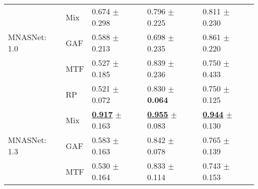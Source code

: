\begin{tabular}{lllll}
 & Mix & \textcolor[rgb]{0.5570023148,0.4429976852,0}{0.674} $\pm$ \textcolor[rgb]{1.0000000000,0.0000000000,0}{0.298} & \textcolor[rgb]{0.5976355483,0.4023644517,0}{0.796} $\pm$ \textcolor[rgb]{0.9362788663,0.0637211337,0}{0.225} & \textcolor[rgb]{0.3411102172,0.5000000000,0}{0.811} $\pm$ \textcolor[rgb]{0.3729254000,0.5000000000,0}{0.230} \\
MNASNet: 1.0 & GAF & \textcolor[rgb]{0.7543402778,0.2456597222,0}{0.588} $\pm$ \textcolor[rgb]{0.7152474728,0.2847525272,0}{0.213} & \textcolor[rgb]{0.9676133533,0.0323866467,0}{0.698} $\pm$ \textcolor[rgb]{0.9920961509,0.0079038491,0}{0.235} & \textcolor[rgb]{0.2123893805,0.5000000000,0}{0.861} $\pm$ \textcolor[rgb]{0.3434889631,0.5000000000,0}{0.220} \\
 & MTF & \textcolor[rgb]{0.8923611111,0.1076388889,0}{0.527} $\pm$ \textcolor[rgb]{0.6198605364,0.3801394636,0}{0.185} & \textcolor[rgb]{0.4349775785,0.5000000000,0}{0.839} $\pm$ \textcolor[rgb]{1.0000000000,0.0000000000,0}{0.236} & \textcolor[rgb]{0.4955752212,0.5000000000,0}{0.750} $\pm$ \textcolor[rgb]{1.0000000000,0.0000000000,0}{0.433} \\
 & RP & \textcolor[rgb]{0.9071180556,0.0928819444,0}{0.521} $\pm$ \textcolor[rgb]{0.2419612355,0.5000000000,0}{0.072} & \textcolor[rgb]{0.4713502740,0.5000000000,0}{0.830} $\pm$ \textbf{\textcolor[rgb]{0.0000000000,0.5000000000,0}{0.064}} & \textcolor[rgb]{0.4955752212,0.5000000000,0}{0.750} $\pm$ \textcolor[rgb]{0.0485555983,0.5000000000,0}{0.125} \\
 & Mix & \underline{\textbf{\textcolor[rgb]{0.0000000000,0.5000000000,0}{0.917}}} $\pm$ \textcolor[rgb]{0.5459381760,0.4540618240,0}{0.163} & \underline{\textbf{\textcolor[rgb]{0.0000000000,0.5000000000,0}{0.955}}} $\pm$ \textcolor[rgb]{0.1108637325,0.5000000000,0}{0.083} & \underline{\textbf{\textcolor[rgb]{0.0000000000,0.5000000000,0}{0.944}}} $\pm$ \textcolor[rgb]{0.0632276993,0.5000000000,0}{0.130} \\
MNASNet: 1.3 & GAF & \textcolor[rgb]{0.7638888889,0.2361111111,0}{0.583} $\pm$ \textcolor[rgb]{0.5459381760,0.4540618240,0}{0.163} & \textcolor[rgb]{0.4231553200,0.5000000000,0}{0.842} $\pm$ \textcolor[rgb]{0.0815616432,0.5000000000,0}{0.078} & \textcolor[rgb]{0.4569589702,0.5000000000,0}{0.765} $\pm$ \textcolor[rgb]{0.0903646116,0.5000000000,0}{0.139} \\
 & MTF & \textcolor[rgb]{0.8854166667,0.1145833333,0}{0.530} $\pm$ \textcolor[rgb]{0.5485317211,0.4514682789,0}{0.164} & \textcolor[rgb]{0.4573991031,0.5000000000,0}{0.833} $\pm$ \textcolor[rgb]{0.2906021337,0.5000000000,0}{0.114} & \textcolor[rgb]{0.5132743363,0.4867256637,0}{0.743} $\pm$ \textcolor[rgb]{0.1340058383,0.5000000000,0}{0.153} \\

\end{tabular}
